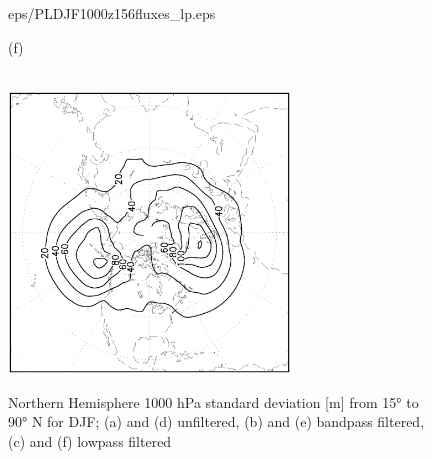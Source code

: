 \documentclass[12pt,a4paper,twoside,openright,headinclude,liststotoc,bibtotoc]{scrreprt}
\begin{document}
\begin{appendix}
\begin{figure}[c]
{{eps/PLDJF1000z156fluxes_lp.eps}
}
\parbox{8.5cm}{\hspace{0.95cm}\begin{scriptsize}(f)\end{scriptsize} \vspace{-0.2cm} \\
\includegraphics[height=7.5cm,angle=-90]
{eps/ERA40_Z1000DJF_fluxes_lp.eps}
}
\caption[Northern Hemisphere 1000 hPa standard deviation]{Northern Hemisphere 1000 hPa standard deviation [m] from 15° to 90° N for DJF; (a) and (d) unfiltered, (b) and (e) bandpass filtered, (c) and (f) lowpass filtered}
\label{img:z1000DJF}
\end{figure}




\end{appendix}
\end{document}

